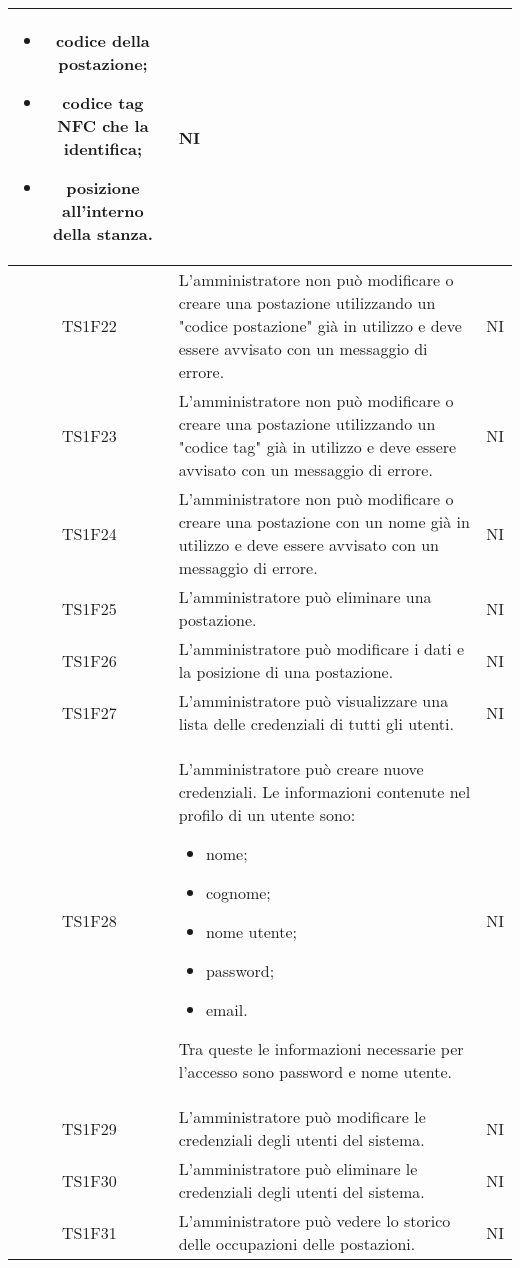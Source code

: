\begin{center}
\begin{longtable}{|c|p{10cm}|c|}
			\begin{itemize}
				\item codice della postazione;
				\item codice tag NFC che la identifica;
				\item posizione all'interno della stanza.
			\end{itemize}
			& NI \\					
			\hline				
			TS1F22 & L'amministratore non può modificare o creare una postazione utilizzando un "codice postazione" già in utilizzo e deve essere avvisato con un messaggio di errore. & NI \\			
			\hline			
			TS1F23 & L'amministratore non può modificare o creare una postazione utilizzando un "codice tag" già in utilizzo e deve essere avvisato con un messaggio di errore. & NI \\			
			\hline			
			TS1F24 & L'amministratore non può modificare o creare una postazione con un nome già in utilizzo e deve essere avvisato con un messaggio di errore. & NI \\			
			\hline
			TS1F25 & L'amministratore può eliminare una postazione. & NI \\	
			\hline	
			TS1F26 & L'amministratore può modificare i dati e la posizione di una postazione. & NI \\			
			\hline	
			TS1F27 & L'amministratore può visualizzare una lista delle credenziali di tutti gli utenti. & NI \\	
			\hline
			TS1F28 & L'amministratore può creare nuove credenziali. Le informazioni contenute nel profilo di un utente sono:
			\begin{itemize}
				\item nome;
				\item cognome;
				\item nome utente;
				\item password;
				\item email.
			\end{itemize}
			Tra queste le informazioni necessarie per l’accesso sono password e nome utente. & NI \\	
			\hline
			TS1F29 & L’amministratore può modificare le credenziali degli utenti del sistema. & NI \\	
			\hline
			TS1F30 & L’amministratore può eliminare le credenziali degli utenti del sistema. & NI \\	
			\hline
			TS1F31 & L'amministratore può vedere lo storico delle occupazioni delle postazioni. & NI \\	

\end{longtable}
\end{center}
